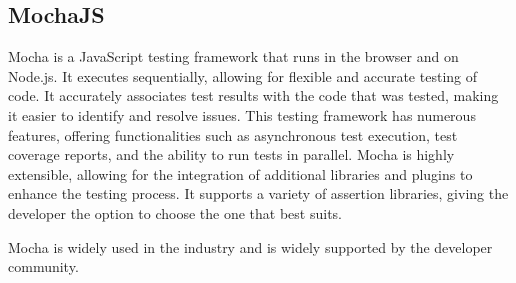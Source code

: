 \subsection{MochaJS}

Mocha is a JavaScript testing framework that runs in the browser and on Node.js. It executes sequentially, allowing for flexible and accurate testing of code. It accurately 
associates test results with the code that was tested, making it easier to identify and resolve issues. 
This testing framework has numerous features, offering functionalities such as asynchronous test execution, test coverage reports, and the ability to run tests in parallel.
Mocha is highly extensible, allowing for the integration of additional libraries and plugins to enhance the testing process. It supports a
variety of assertion libraries, giving the developer the option to choose the one that best suits. 

Mocha is widely used in the industry and is widely supported by the developer community. \cite{mocha}

